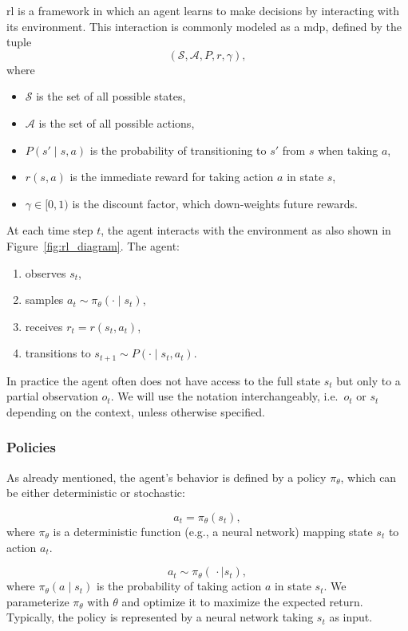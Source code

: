 \gls{rl} is a framework in which an agent learns to make decisions by interacting with its environment.  This interaction is commonly modeled as a \gls{mdp}, defined by the tuple
\[
(\mathcal{S}, \mathcal{A}, P, r, \gamma),
\]
where
\begin{itemize}
  \item \(\mathcal{S}\) is the set of all possible states,
  \item \(\mathcal{A}\) is the set of all possible actions,
  \item \(P(s'\!\mid\!s,a)\) is the probability of transitioning to \(s'\) from \(s\) when taking \(a\),
  \item \(r(s,a)\) is the immediate reward for taking action \(a\) in state \(s\),
  \item \(\gamma\in[0,1)\) is the discount factor, which down‐weights future rewards.
\end{itemize}

At each time step \(t\), the agent interacts with the environment as also shown in Figure~\ref{fig:rl_diagram}. The agent:
\begin{enumerate}
  \item observes \(s_t\),
  \item samples \(a_t\sim\pi_\theta(\cdot\mid s_t)\),
  \item receives \(r_t = r(s_t,a_t)\),
  \item transitions to \(s_{t+1}\sim P(\cdot\mid s_t,a_t)\).
\end{enumerate}
In practice the agent often does not have access to the full state \(s_t\) but only to a partial observation \(o_t\).  We will use the notation interchangeably, i.e.\ \(o_t\) or \(s_t\) depending on the context, unless otherwise specified.
\subsubsection{Policies}
As already mentioned, the agent's behavior is defined by a policy \(\pi_\theta\), which can be either deterministic or stochastic:
 
    \[
      a_t = \pi_{\theta}(s_t),
    \]
    where \(\pi_{\theta}\) is a deterministic function (e.g., a neural network) mapping state \(s_t\) to action \(a_t\).

    \[
      a_t \sim \pi_{\theta}(\,\cdot\mid s_t),
    \]
    where \(\pi_{\theta}(a\mid s_t)\) is the probability of taking action \(a\) in state \(s_t\).
We parameterize \(\pi_{\theta}\) with \(\theta\) and optimize it to maximize the expected return. Typically, the policy is represented by a neural network taking \(s_t\) as input.

